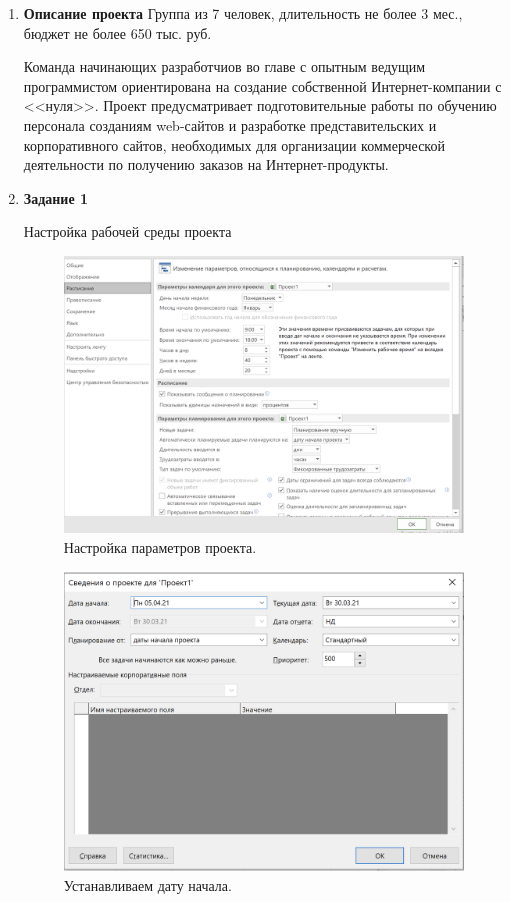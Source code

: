 \documentclass[a4paper,14pt]{extreport} %
\begin{document}
\begin{enumerate}

\item \textbf{Описание проекта}
Группа из 7 человек, длительность не более 3 мес., бюджет не более 650 тыс. руб.

Команда начинающих разработчиов во главе с опытным ведущим программистом ориентирована на создание собственной Интернет-компании с <<нуля>>. Проект предусматривает подготовительные работы по обучению персонала созданиям web-сайтов и разработке представительских и корпоративного сайтов, необходимых для организации коммерческой деятельности по получению заказов на Интернет-продукты.

\item \textbf{Задание 1}

Настройка рабочей среды проекта

\begin{figure}[H]
  \centering
  \caption{Настройка параметров проекта. }
  \includegraphics[scale=0.5]{1}
\end{figure}

\begin{figure}[H]
  \centering
  \caption{Устанавливаем дату начала. }
  \includegraphics[scale=0.6]{2}
\end{figure}


\end{enumerate}
\end{document}
